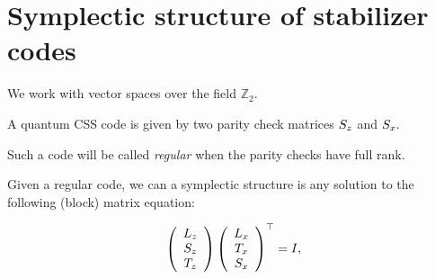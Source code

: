 


%
%
%


\section{Symplectic structure of stabilizer codes}

We work with vector spaces over the field $\mathbb{Z}_2.$

A quantum CSS code is given by two
parity check matrices $\S_z$ and $\S_x.$

Such a code will be called {\it regular}
when the parity checks have full rank.

Given a regular code, we can
a symplectic structure is any
solution to the following (block)
matrix equation:

$$
\left(
\begin{array}{c}
L_z \\
\S_z \\
T_z \\
\end{array}
\right)\left(
\begin{array}{c}
L_x \\
T_x \\
\S_x \\
\end{array}
\right)^\top = I,
$$

